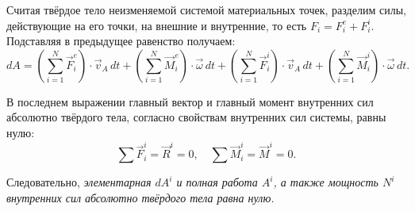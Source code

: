 Считая твёрдое тело неизменяемой системой материальных точек, разделим силы, 
действующие на его точки, на внешние и внутренние, то есть 
\( F_i = F^e_i + F^i_i \). Подставляя в предыдущее равенство получаем:
\[ 
	dA = \left( \sum_{i=1}^{N} \vec{F}^e_i \right)\cdot\vec{v}_A\,dt + 
	\left( \sum_{i=1}^{N} \vec{M}_{i}^e \right)\cdot\vec{\omega}\,dt +
	\left( \sum_{i=1}^{N} \vec{F}^i_i \right)\cdot\vec{v}_A\,dt + 
	\left( \sum_{i=1}^{N} \vec{M}_{i}^i \right)\cdot\vec{\omega}\,dt.
\]

В последнем выражении главный вектор и главный момент внутренних сил 
абсолютно твёрдого тела, согласно свойствам внутренних сил системы, равны нулю:
\[ 
	\sum\vec{F}^i_i = \vec{R}^i = 0,\quad 
	\sum\vec{M}_{i}^i = \vec{M}^i = 0.
\]

Следовательно, \emph{элементарная \( dA^i\) и полная работа \( A^i \), 
а также мощность \( N^i \) внутренних сил абсолютно твёрдого тела 
равна нулю.}

\newpage
